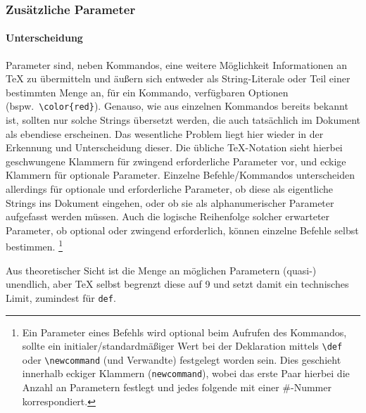 \subsubsection{Zusätzliche Parameter}
\paragraph{Unterscheidung}\par
Parameter sind, neben Kommandos, eine weitere Möglichkeit Informationen an \TeX{} zu übermitteln und äußern sich entweder als String-Literale oder Teil einer bestimmten Menge an, für ein Kommando, verfügbaren Optionen (bspw.\ \verb|\color{red}|). Genauso, wie aus einzelnen Kommandos bereits bekannt ist, sollten nur solche Strings übersetzt werden, die auch tatsächlich im Dokument als ebendiese erscheinen. 
Das wesentliche Problem liegt hier wieder in der Erkennung und Unterscheidung dieser. 
Die übliche \TeX{}-Notation sieht hierbei geschwungene Klammern für zwingend erforderliche Parameter vor, und eckige Klammern für optionale Parameter. 
Einzelne Befehle/Kommandos unterscheiden allerdings für optionale und erforderliche Parameter, ob diese als eigentliche Strings ins Dokument eingehen, oder ob sie als alphanumerischer Parameter aufgefasst werden müssen. 
Auch die logische Reihenfolge solcher erwarteter Parameter, ob optional oder zwingend erforderlich, können einzelne Befehle selbst bestimmen.
\footnote{Ein Parameter eines Befehls wird optional beim Aufrufen des Kommandos, sollte ein initialer/standardmäßiger Wert bei der Deklaration mittels \verb"\def" oder \verb"\newcommand" (und Verwandte) festgelegt worden sein. Dies geschieht innerhalb eckiger Klammern (\texttt{newcommand}), wobei das erste Paar hierbei die Anzahl an Parametern festlegt und jedes folgende mit einer \#-Nummer korrespondiert.}

Aus theoretischer Sicht ist die Menge an möglichen Parametern (quasi-) unendlich, aber \TeX{} selbst begrenzt diese auf 9 und setzt damit ein technisches Limit, zumindest für \texttt{def}. 


